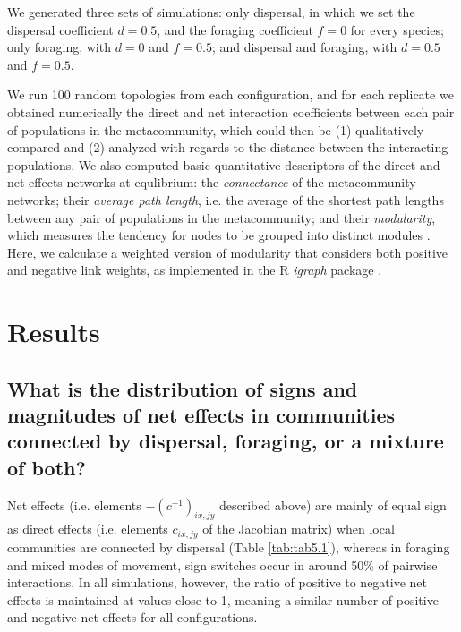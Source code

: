 We generated three sets of simulations: only dispersal, in which we set the dispersal coefficient $d = 0.5$, and the foraging coefficient $f = 0$ for every species; only foraging, with $d = 0$ and $f = 0.5$; and dispersal and foraging, with $d = 0.5$ and $f = 0.5$.

We run 100 random topologies from each configuration, and for each replicate we obtained numerically the direct and net interaction coefficients between each pair of populations in the metacommunity, which could then be (1) qualitatively compared and (2) analyzed with regards to the distance between the interacting populations. We also computed basic quantitative descriptors of the direct and net effects networks at equlibrium: the \textit{connectance} of the metacommunity networks; their \textit{average path length}, i.e. the average of the shortest path lengths between any pair of populations in the metacommunity; and their \textit{modularity}, which measures the tendency for nodes to be grouped into distinct modules \citep{Newman2006}. Here, we calculate a weighted version of modularity that considers both positive and negative link weights, as implemented in the R \textit{igraph} package \citep{Csardi2006}.

\section{Results}

\subsection*{What is the distribution of signs and magnitudes of net effects in communities connected by dispersal, foraging, or a mixture of both?}

Net effects (i.e. elements $-(c^{-1})_{ix,jy}$ described above) are mainly of equal sign as direct effects (i.e. elements $c_{ix,jy}$ of the Jacobian matrix) when local communities are connected by dispersal (Table \ref{tab:tab5.1}), whereas in foraging and mixed modes of movement, sign switches occur in around 50\% of pairwise interactions. In all simulations, however, the ratio of positive to negative net effects is maintained at values close to 1, meaning a similar number of positive and negative net effects for all configurations.

